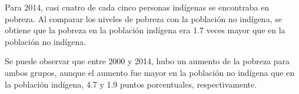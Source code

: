 Para 2014, casi cuatro de cada cinco personas indígenas se encontraba en pobreza. Al comparar los niveles de pobreza con la población no indígena, se obtiene que la pobreza en la población indígena era 1.7 veces mayor que en la población no indígena.

 Se puede observar que entre 2000 y 2014, hubo un aumento de la pobreza para ambos grupos, aunque el aumento fue mayor en la población no indígena que en la población indígena, 4.7 y 1.9 puntos porcentuales, respectivamente.